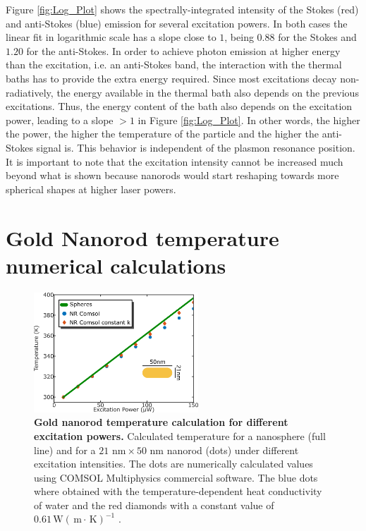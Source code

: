 \documentclass[journal=nalefd,manuscript=letter]{achemso}
\newcommand{\K}{\ensuremath{\,\textrm{K}}}
\newcommand{\nm}{\ensuremath{\,\textrm{nm}}}
\newcommand{\m}{\ensuremath{\,\textrm{m}}}
\newcommand{\W}{\ensuremath{\,\textrm{W}}}
\begin{document}
Figure \ref{fig:Log_Plot} shows the spectrally-integrated intensity of the Stokes (red) and
anti-Stokes (blue) emission for several excitation powers. In both cases the
linear fit in logarithmic scale has a slope close to $1$, being $0.88$ for the
Stokes and $1.20$ for the anti-Stokes. 
In order to achieve photon emission at higher energy than the excitation, 
i.e. an anti-Stokes band, the interaction with the thermal baths 
has to provide the extra energy required. Since most 
excitations decay non-radiatively, the energy available in the thermal bath 
also depends on the previous excitations. Thus, the energy content of the 
bath also depends on the excitation power, leading
to a slope $>1$ in Figure \ref{fig:Log_Plot}. In other words, the higher the power, 
the higher the temperature of the particle and the higher the anti-Stokes signal is. 
This behavior is independent of the plasmon resonance position. 
It is important to note that the excitation intensity cannot
be increased much beyond what is shown because nanorods would start reshaping
towards more spherical shapes at higher laser powers.



\pagebreak
\section{Gold Nanorod temperature numerical calculations} \label{sec:temp-calc}

\begin{figure}[htp] \centering
\includegraphics[width=0.55\textwidth]{Figures/Supplementary/04_Compare_Comsol/04_Compare_Comsol.png}
\caption{\textbf{Gold nanorod temperature calculation for different excitation powers.}
Calculated temperature for a nanosphere (full line) and 
for a $21\,\nm\times 50\,\nm$ nanorod (dots) under different excitation intensities. 
The dots are numerically calculated values using COMSOL Multiphysics commercial software. 
The blue dots where obtained with the temperature-dependent heat conductivity of water 
and the red diamonds with a constant value of $0.61 \W(\m\cdot\K)^{-1}$ .}
	\label{fig:Compare-Comsol}
\end{figure}
\end{document}
